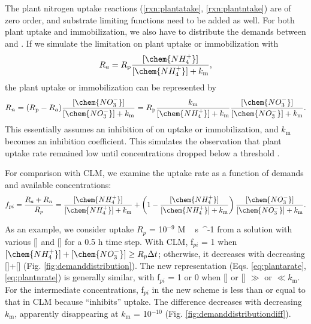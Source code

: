 \documentclass[gmd, manuscript]{copernicus}
\begin{document}
The plant nitrogen uptake reactions (\ref{rxn:plantatake},
\ref{rxn:plantntake}) are of zero order, and substrate limiting functions need
to be added as well. For both plant uptake and immobilization, we also have to
distribute the demands between  and . If we simulate
the  limitation on plant uptake or immobilization with
\begin{equation}
R_a = R_\text{p} \frac{[\chem{NH_4^+}]}{[\chem{NH_4^+}]+k_\text{m}}, 
\label{eq:plantarate}
\end{equation}
the  plant uptake or immobilization can be represented by 
\begin{equation}
R_n = (R_\text{p} - R_a)\frac{[\chem{NO_3^-}]}{[\chem{NO_3^-}]+k_\text{m}} =
R_\text{p} \frac{k_\text{m}}{[\chem{NH_4^+}]+k_\text{m}}
\frac{[\chem{NO_3^-}]}{[\chem{NO_3^-}]+k_\text{m}}.  
\label{eq:plantnrate}
\end{equation}
This essentially assumes an inhibition of  on  uptake
or immobilization, and $k_\text{m}$ becomes an inhibition coefficient. This
simulates the observation that plant  uptake rate remained low
until  concentrations dropped below a threshold
\citep{eltrop1996}.  

For comparison with CLM, we examine the uptake rate as a function of demands
and available concentrations:
\begin{equation}
f_{pi} = \frac{R_a + R_n}{R_p} =
\frac{[\chem{NH_4^+}]}{[\chem{NH_4^+}]+k_\text{m}} +
\left(1 - \frac{[\chem{NH_4^+}]}{[\chem{NH_4^+}]+k_\text{m}}\right)
\frac{[\chem{NO_3^-}]}{[\chem{NO_3^-}]+k_\text{m}}.
\label{eq:fpi}
\end{equation}

As an example, we consider uptake $R_p$ = 10$^{-9}$ \unit{M\,s{^{-1}}} from a
solution with various [] and [] for a 0.5 h time
step. With CLM, f$_{pi}$ = 1 when $[\chem{NH_4^+}]+[\chem{NO_3^-}]\geq
R_p\Delta t$; otherwise, it decreases with decreasing
[]+[] (Fig. \ref{fig:demanddistribution}). The new
representation (Eqs. \ref{eq:plantarate}, \ref{eq:plantnrate}) is generally
similar, with f$_{pi}$ = 1 or 0 when [] or [] $\gg$
or $\ll k_\text{m}$. For the intermediate concentrations, f$_{pi}$ in the new
scheme is less than or equal to that in CLM because  ``inhibits''
 uptake. The difference decreases with decreasing $k_\text{m}$,
apparently disappearing at $k_\text{m}$ = 10$^{-10}$ (Fig. \ref{fig:demanddistributiondiff}). 
\end{document}
